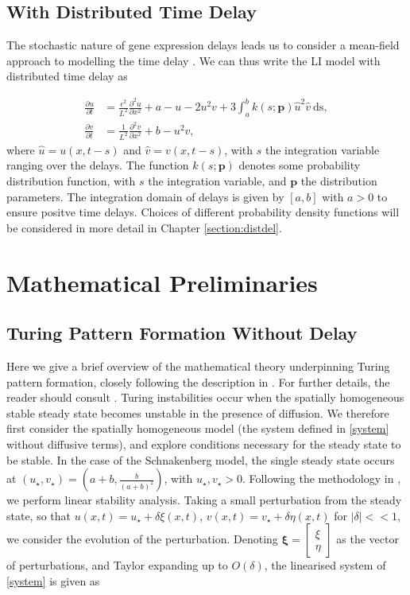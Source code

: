\subsection{With Distributed Time Delay}

The stochastic nature of gene expression delays leads us to consider a mean-field approach to modelling the time delay \cite{bratsun,krausenew}. We can thus write the LI model with distributed time delay as

\begin{equation}\label{distmodel}
  \begin{split}
    \frac{\partial u}{\partial t}&=\frac{\epsilon^2}{L^2}\frac{\partial^2u}{\partial x^2}+a-u-2u^2v+3\int_{a}^{b}k(s;\textbf{p})\hat{u}^2\hat{v} \ \text{ds},\\
    \frac{\partial v}{\partial t}&=\frac{1}{L^2}\frac{\partial^2v}{\partial x^2}+b-u^2v,
\end{split}
\end{equation}
where $\hat{u}=u(x,t-s)$ and $\hat{v}=v(x,t-s)$, with $s$ the integration variable ranging over the delays. The function $k(s;\textbf{p})$ denotes some probability distribution function, with $s$ the integration variable, and $\textbf{p}$ the distribution parameters. The integration domain of delays is given by $[a,b]$ with $a>0$ to ensure positve time delays. Choices of different probability density functions will be considered in more detail in Chapter \ref{section:distdel}.

\section{Mathematical Preliminaries}
\subsection{Turing Pattern Formation Without Delay}
Here we give a brief overview of the mathematical theory underpinning Turing pattern formation, closely following the description in \cite{murray}. For further details, the reader should consult \cite{murray,beentjes}. Turing instabilities occur when the spatially homogeneous stable steady state becomes unstable in the presence of diffusion. We therefore first consider the spatially homogeneous model (the system defined in \eqref{system} without diffusive terms), and explore conditions necessary for the steady state to be stable. In the case of the Schnakenberg model, the single steady state occurs at $(u_\star, v_\star)=\left(a+b, \frac{b}{(a+b)^2}\right)$, with $u_\star,v_\star>0$. Following the methodology in \cite{murray}, we perform linear stability analysis. Taking a small perturbation from the steady state, so that $u(x,t)=u_\star+\delta\xi(x,t) $, $v(x,t)=v_\star+\delta\eta(x,t) $ for $|\delta|<<1$, we consider the evolution of the perturbation. Denoting $\pmb{\xi}=\begin{bmatrix}\xi \\ \eta\end{bmatrix}$ as the vector of perturbations, and Taylor expanding up to $O(\delta)$, the linearised system of \eqref{system} is given as

